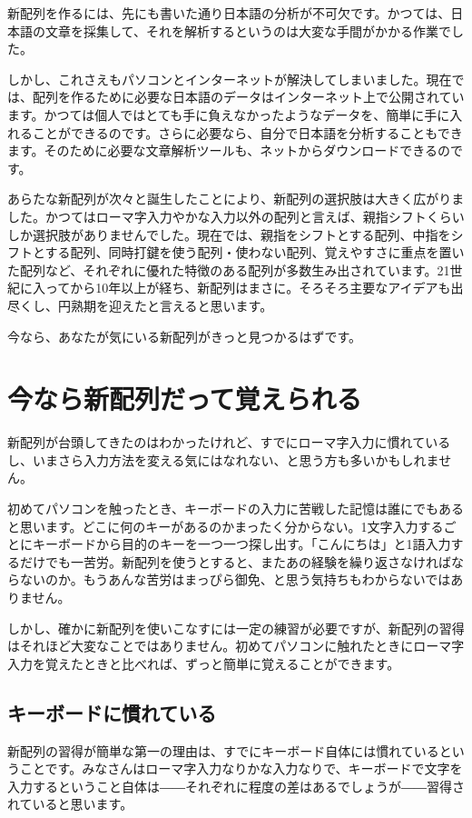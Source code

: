 新配列を作るには、先にも書いた通り日本語の分析が不可欠です。かつては、日本語の文章を採集して、それを解析するというのは大変な手間がかかる作業でした。

しかし、これさえもパソコンとインターネットが解決してしまいました。現在では、配列を作るために必要な日本語のデータはインターネット上で公開されています。かつては個人ではとても手に負えなかったようなデータを、簡単に手に入れることができるのです。さらに必要なら、自分で日本語を分析することもできます。そのために必要な文章解析ツールも、ネットからダウンロードできるのです。

あらたな新配列が次々と誕生したことにより、新配列の選択肢は大きく広がりました。かつてはローマ字入力やかな入力以外の配列と言えば、親指シフトくらいしか選択肢がありませんでした。現在では、親指をシフトとする配列、中指をシフトとする配列、同時打鍵を使う配列・使わない配列、覚えやすさに重点を置いた配列など、それぞれに優れた特徴のある配列が多数生み出されています。21世紀に入ってから10年以上が経ち、新配列はまさに。そろそろ主要なアイデアも出尽くし、円熟期を迎えたと言えると思います。

今なら、あなたが気にいる新配列がきっと見つかるはずです。

\section{今なら新配列だって覚えられる}

新配列が台頭してきたのはわかったけれど、すでにローマ字入力に慣れているし、いまさら入力方法を変える気にはなれない、と思う方も多いかもしれません。

初めてパソコンを触ったとき、キーボードの入力に苦戦した記憶は誰にでもあると思います。どこに何のキーがあるのかまったく分からない。1文字入力するごとにキーボードから目的のキーを一つ一つ探し出す。「こんにちは」と1語入力するだけでも一苦労。新配列を使うとすると、またあの経験を繰り返さなければならないのか。もうあんな苦労はまっぴら御免、と思う気持ちもわからないではありません。

しかし、確かに新配列を使いこなすには一定の練習が必要ですが、新配列の習得はそれほど大変なことではありません。初めてパソコンに触れたときにローマ字入力を覚えたときと比べれば、ずっと簡単に覚えることができます。

\subsection{キーボードに慣れている}

新配列の習得が簡単な第一の理由は、すでにキーボード自体には慣れているということです。みなさんはローマ字入力なりかな入力なりで、キーボードで文字を入力するということ自体は――それぞれに程度の差はあるでしょうが――習得されていると思います。

